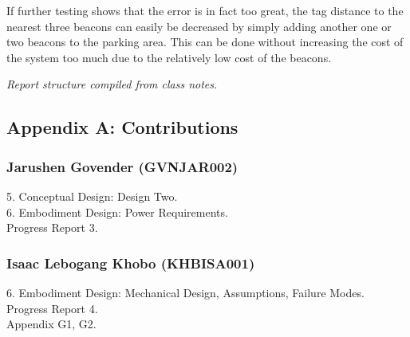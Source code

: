 If further testing shows that the error is in fact too great, the tag distance to the nearest three beacons
can easily be decreased by simply adding another one or two beacons to the parking area. This can be
done without increasing the cost of the system too much due to the relatively low cost of the beacons.

\textit{Report structure compiled from class notes.}\cite{handout}\cite{notes}



\newpage





\newpage
\vspace*{\fill}
\begin{center}
\subsection*{Appendix A: Contributions}
\end{center}
\vspace*{\fill}

\newpage
\subsubsection*{Jarushen Govender (GVNJAR002)}
5. Conceptual Design: Design Two.\\
6. Embodiment Design: Power Requirements.\\
Progress Report 3.
\subsubsection*{Isaac Lebogang Khobo (KHBISA001)}
6. Embodiment Design: Mechanical Design, Assumptions, Failure Modes.\\
Progress Report 4. \\
Appendix G1, G2.
